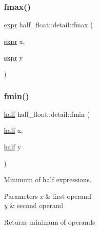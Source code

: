 \mbox{\label{namespacehalf__float_1_1detail_a28654fedb6753018e804eab6f53a5efb}} 
\subsubsection{\texorpdfstring{fmax()}{fmax()}\hspace{0.1cm}{\footnotesize\ttfamily [4/4]}}
{\footnotesize\ttfamily \hyperlink{structhalf__float_1_1detail_1_1expr}{expr} half\+\_\+float\+::detail\+::fmax (\begin{DoxyParamCaption}\item[{\hyperlink{structhalf__float_1_1detail_1_1expr}{expr}}]{x,  }\item[{\hyperlink{structhalf__float_1_1detail_1_1expr}{expr}}]{y }\end{DoxyParamCaption})\hspace{0.3cm}{\ttfamily [inline]}}

\mbox{\label{namespacehalf__float_1_1detail_a9b147d2e64476167b7e9ee41ce14f36c}} 
\subsubsection{\texorpdfstring{fmin()}{fmin()}\hspace{0.1cm}{\footnotesize\ttfamily [1/4]}}
{\footnotesize\ttfamily \hyperlink{classhalf__float_1_1half}{half} half\+\_\+float\+::detail\+::fmin (\begin{DoxyParamCaption}\item[{\hyperlink{classhalf__float_1_1half}{half}}]{x,  }\item[{\hyperlink{classhalf__float_1_1half}{half}}]{y }\end{DoxyParamCaption})\hspace{0.3cm}{\ttfamily [inline]}}

Minimum of half expressions. 
\begin{DoxyParams}{Parameters}
{\em x} & first operand \\
\hline
{\em y} & second operand \\
\hline
\end{DoxyParams}
\begin{DoxyReturn}{Returns}
minimum of operands 
\end{DoxyReturn}
\mbox{\label{namespacehalf__float_1_1detail_a9ba6bab3339ee8ba80447452e780e33c}} 
